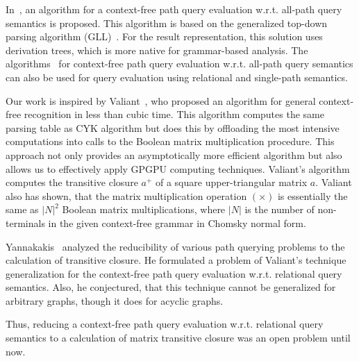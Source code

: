 In~\cite{GLL}, an algorithm for a context-free path query evaluation w.r.t. all-path query semantics is proposed. This algorithm is based on the generalized top-down parsing algorithm (GLL)~\cite{scott2010gll}. For the result representation, this solution uses derivation trees, which is more native for grammar-based analysis. The algorithms~\cite{GLL, hellingsPathQuerying} for context-free path query evaluation w.r.t. all-path query semantics can also be used for query evaluation using relational and single-path semantics.

Our work is inspired by Valiant~\cite{valiant}, who proposed an algorithm for general context-free recognition in less than cubic time. This algorithm computes the same parsing table as CYK algorithm but does this by offloading the most intensive computations into calls to the Boolean matrix multiplication procedure. This approach not only provides an asymptotically more efficient algorithm but also allows us to effectively apply GPGPU computing techniques. Valiant's algorithm computes the transitive closure $a^+$ of a square upper-triangular matrix $a$. Valiant also has shown, that the matrix multiplication operation $(\times)$ is essentially the same as $|N|^2$ Boolean matrix multiplications, where $|N|$ is the number of non-terminals in the given context-free grammar in Chomsky normal form.

Yannakakis~\cite{transitive-closure} analyzed the reducibility of various path querying problems to the calculation of transitive closure. He formulated a problem of Valiant's technique generalization for the context-free path query evaluation w.r.t. relational query semantics. Also, he conjectured, that this technique cannot be generalized for arbitrary graphs, though it does for acyclic graphs.

Thus, reducing a context-free path query evaluation w.r.t. relational query semantics to a calculation of matrix transitive closure was an open problem until now.